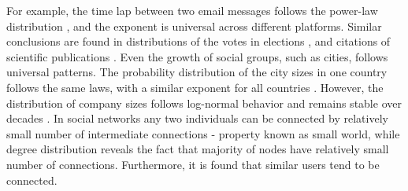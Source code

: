 For example, the time lap between two email messages follows the power-law distribution \cite{garas2012emotional}, and the exponent is universal across different platforms. Similar conclusions are found in distributions of the votes in elections \cite{fortunato2007scaling, chatterjee2013}, and citations of scientific publications \cite{radicchi2008}. Even the growth of social groups, such as cities, follows universal patterns. The probability distribution of the city sizes in one country follows the same laws, with a similar exponent for all countries \cite{barthelemy2019, fazio2015pareto}. However, the distribution of company sizes follows log-normal behavior and remains stable over decades \cite{amaral1997scaling, stanley1996scaling}. 
In social networks any two individuals can be connected by relatively small number of intermediate connections - property known as small world, while degree distribution reveals the fact that majority of nodes have relatively small number of connections. Furthermore, it is found that similar users tend to be connected. 




















